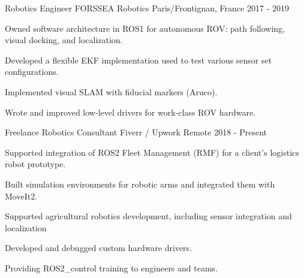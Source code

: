 \begin{cventries}
  \cventry
    {Robotics Engineer} %
    {FORSSEA Robotics} %
    {Paris/Frontignan, France} %
    {2017 - 2019} %
    {
      \begin{cvitems} %
        \item Owned software architecture in ROS1 for autonomous ROV: path following, visual docking, and localization.
        \item Developed a flexible EKF implementation used to test various sensor set configurations.
        \item Implemented visual SLAM with fiducial markers (Aruco).
        \item Wrote and improved low-level drivers for work-class ROV hardware.
      \end{cvitems}
    }



  \cventry
    {Freelance Robotics Consultant} %
    {Fiverr / Upwork} %
    {Remote} %
    {2018 - Present} %
    {
      \begin{cvitems} %
        \item Supported integration of ROS2 Fleet Management (RMF) for a client’s logistics robot prototype.
        \item Built simulation environments for robotic arms and integrated them with MoveIt2.
        \item Supported agricultural robotics development, including sensor integration and localization
        \item Developed and debugged custom hardware drivers.
        \item Providing ROS2\_control training to engineers and teams.
      \end{cvitems}
    }

\end{cventries}
